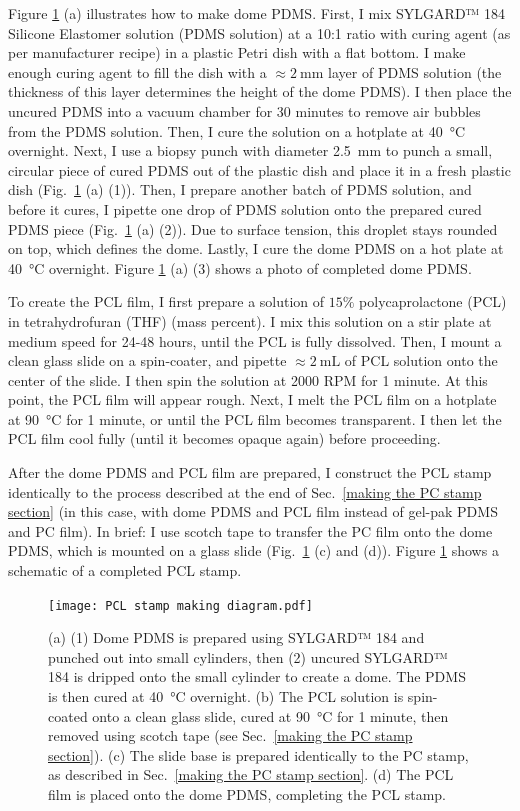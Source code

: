 \documentclass[double,12pt,1in,seploa]{beavtex}
\begin{document}
Figure \ref{PCL stamp making diagram} (a) illustrates how to make dome PDMS. First, I mix SYLGARD™ 184 Silicone Elastomer solution (PDMS solution) at a 10:1 ratio with curing agent (as per manufacturer recipe) in a plastic Petri dish with a flat bottom. I make enough curing agent to fill the dish with a $\approx \SI{2}{\milli\meter}$ layer of PDMS solution (the thickness of this layer determines the height of the dome PDMS). I then place the uncured PDMS into a vacuum chamber for 30 minutes to remove air bubbles from the PDMS solution. Then, I cure the solution on a hotplate at \SI{40}{\celsius} overnight. Next, I use a biopsy punch with diameter \SI{2.5}{\milli\meter} to punch a small, circular piece of cured PDMS out of the plastic dish and place it in a fresh plastic dish (Fig.\ \ref{PCL stamp making diagram} (a) (1)). Then, I prepare another batch of PDMS solution, and before it cures, I pipette one drop of PDMS solution onto the prepared cured PDMS piece (Fig.\ \ref{PCL stamp making diagram} (a) (2)). Due to surface tension, this droplet stays rounded on top, which defines the dome. Lastly, I cure the dome PDMS on a hot plate at \SI{40}{\celsius} overnight. Figure \ref{PCL stamp making diagram} (a) (3) shows a photo of completed dome PDMS.

To create the PCL film, I first prepare a solution of $15 \%$ polycaprolactone (PCL) in tetrahydrofuran (THF) (mass percent). I mix this solution on a stir plate at medium speed for 24-48 hours, until the PCL is fully dissolved. Then, I mount a clean glass slide on a spin-coater, and pipette $\approx \SI{2}{\milli\liter}$ of PCL solution onto the center of the slide. I then spin the solution at 2000 RPM for 1 minute. At this point, the PCL film will appear rough. Next, I melt the PCL film on a hotplate at \SI{90}{\celsius} for 1 minute, or until the PCL film becomes transparent. I then let the PCL film cool fully (until it becomes opaque again) before proceeding.

After the dome PDMS and PCL film are prepared, I construct the PCL stamp identically to the process described at the end of Sec.\ \ref{making the PC stamp section} (in this case, with dome PDMS and PCL film instead of gel-pak PDMS and PC film). In brief: I use scotch tape to transfer the PC film onto the dome PDMS, which is mounted on a glass slide (Fig.\ \ref{PCL stamp making diagram} (c) and (d)). Figure \ref{PCL stamp making diagram} shows a schematic of a completed PCL stamp.

\begin{figure}
    \texttt{[image: PCL stamp making diagram.pdf]}
    \caption{(a) (1) Dome PDMS is prepared using SYLGARD™ 184 and punched out into small cylinders, then (2) uncured SYLGARD™ 184 is dripped onto the small cylinder to create a dome. The PDMS is then cured at \SI{40}{\celsius} overnight. (b) The PCL solution is spin-coated onto a clean glass slide, cured at \SI{90}{\celsius} for 1 minute, then removed using scotch tape (see Sec.\ \ref{making the PC stamp section}). (c) The slide base is prepared identically to the PC stamp, as described in Sec.\ \ref{making the PC stamp section}. (d) The PCL film is placed onto the dome PDMS, completing the PCL stamp.}
    \label{PCL stamp making diagram}
\end{figure}
\end{document}

